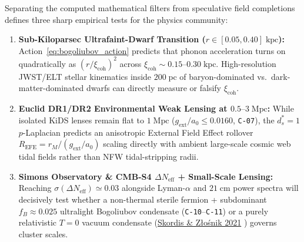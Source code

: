 \documentclass[11pt,letterpaper]{article}
\begin{document}
Separating the computed mathematical filters from speculative field completions defines three sharp empirical tests for the physics community:
\begin{enumerate}
  \setlength{\itemsep}{3pt}\setlength{\parskip}{0pt}
  \item \textbf{Sub-Kiloparsec Ultrafaint-Dwarf Transition ($r \in [0.05, 0.40]\;\mathrm{kpc}$):} Action~\eqref{eq:bogoliubov_action} predicts that phonon acceleration turns on quadratically as $(r/\xi_{\mathrm{coh}})^2$ across $\xi_{\mathrm{coh}} \sim 0.15\text{--}0.30\;\mathrm{kpc}$. High-resolution JWST/ELT stellar kinematics inside $200\;\mathrm{pc}$ of baryon-dominated vs.\ dark-matter-dominated dwarfs can directly measure or falsify $\xi_{\mathrm{coh}}$.
  \item \textbf{Euclid DR1/DR2 Environmental Weak Lensing at $0.5\text{--}3\;\mathrm{Mpc}$:} While isolated KiDS lenses remain flat to $1\;\mathrm{Mpc}$ ($g_{\mathrm{ext}}/a_0 \le 0.0160$, \texttt{C-07}), the $d_s^* = 1$ $p$-Laplacian predicts an anisotropic External Field Effect rollover $R_{\mathrm{EFE}} = r_M / (g_{\mathrm{ext}}/a_0)$ scaling directly with ambient large-scale cosmic web tidal fields rather than NFW tidal-stripping radii.
  \item \textbf{Simons Observatory \& CMB-S4 $\Delta N_{\mathrm{eff}}$ + Small-Scale Lensing:} Reaching $\sigma(\Delta N_{\mathrm{eff}}) \simeq 0.03$ alongside Lyman-$\alpha$ and $21\;\mathrm{cm}$ power spectra will decisively test whether a non-thermal sterile fermion + subdominant $f_B \approx 0.025$ ultralight Bogoliubov condensate (\texttt{C-10}--\texttt{C-11}) or a purely relativistic $T=0$ vacuum condensate (\href{https://link.aps.org/doi/10.1103/PhysRevLett.127.161302}{Skordis \& Z\l{}o\'snik 2021} \cite{SkordisZlosnik2021}) governs cluster scales.
\end{enumerate}
\end{document}
